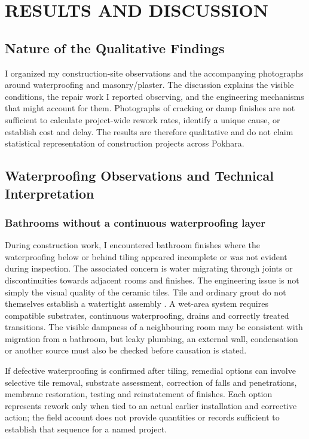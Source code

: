 \chapter{RESULTS AND DISCUSSION}
\section{Nature of the Qualitative Findings}
I organized my construction-site observations and the accompanying photographs around waterproofing and masonry/plaster. The discussion explains the visible conditions, the repair work I reported observing, and the engineering mechanisms that might account for them. Photographs of cracking or damp finishes are not sufficient to calculate project-wide rework rates, identify a unique cause, or establish cost and delay. The results are therefore qualitative and do not claim statistical representation of construction projects across Pokhara.

\section{Waterproofing Observations and Technical Interpretation}
\subsection{Bathrooms without a continuous waterproofing layer}
During construction work, I encountered bathroom finishes where the waterproofing below or behind tiling appeared incomplete or was not evident during inspection. The associated concern is water migrating through joints or discontinuities towards adjacent rooms and finishes. The engineering issue is not simply the visual quality of the ceramic tiles. Tile and ordinary grout do not themselves establish a watertight assembly \parencite{schluter2026,tcna2023}. A wet-area system requires compatible substrates, continuous waterproofing, drains and correctly treated transitions. The visible dampness of a neighbouring room may be consistent with migration from a bathroom, but leaky plumbing, an external wall, condensation or another source must also be checked before causation is stated.

If defective waterproofing is confirmed after tiling, remedial options can involve selective tile removal, substrate assessment, correction of falls and penetrations, membrane restoration, testing and reinstatement of finishes. Each option represents rework only when tied to an actual earlier installation and corrective action; the field account does not provide quantities or records sufficient to establish that sequence for a named project.


